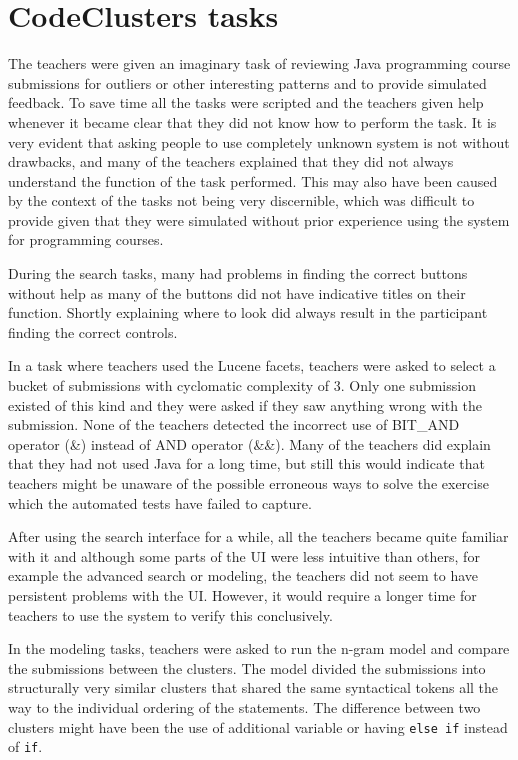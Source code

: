 \section{CodeClusters tasks}

The teachers were given an imaginary task of reviewing Java programming course submissions for outliers or other interesting patterns and to provide simulated feedback. To save time all the tasks were scripted and the teachers given help whenever it became clear that they did not know how to perform the task. It is very evident that asking people to use completely unknown system is not without drawbacks, and many of the teachers explained that they did not always understand the function of the task performed. This may also have been caused by the context of the tasks not being very discernible, which was difficult to provide given that they were simulated without prior experience using the system for programming courses.

During the search tasks, many had problems in finding the correct buttons without help as many of the buttons did not have indicative titles on their function. Shortly explaining where to look did always result in the participant finding the correct controls.

In a task where teachers used the Lucene facets, teachers were asked to select a bucket of submissions with cyclomatic complexity of 3. Only one submission existed of this kind and they were asked if they saw anything wrong with the submission. None of the teachers detected the incorrect use of BIT\_AND operator (\&) instead of AND operator (\&\&). Many of the teachers did explain that they had not used Java for a long time, but still this would indicate that teachers might be unaware of the possible erroneous ways to solve the exercise which the automated tests have failed to capture.

After using the search interface for a while, all the teachers became quite familiar with it and although some parts of the UI were less intuitive than others, for example the advanced search or modeling, the teachers did not seem to have persistent problems with the UI. However, it would require a longer time for teachers to use the system to verify this conclusively.

In the modeling tasks, teachers were asked to run the n-gram model and compare the submissions between the clusters. The model divided the submissions into structurally very similar clusters that shared the same syntactical tokens all the way to the individual ordering of the statements. The difference between two clusters might have been the use of additional variable or having \texttt{else if} instead of \texttt{if}.

